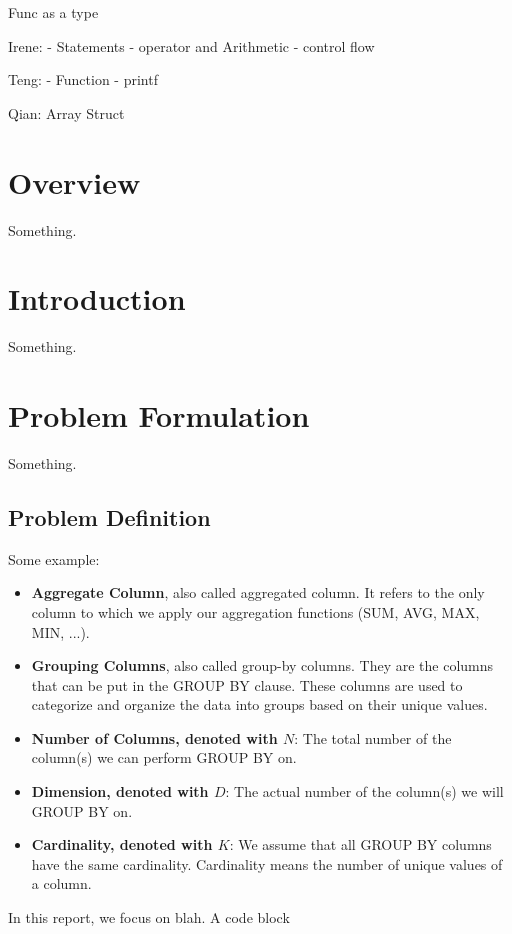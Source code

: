 \documentclass[11pt,A4]{article}
\begin{document}
Func as a type

Irene: 
- Statements
- operator and Arithmetic
- control flow

Teng:
- Function
- printf

Qian:
Array
Struct

\section{Overview}

Something.

\section{Introduction}

Something.


\section{Problem Formulation}

Something.



\subsection{Problem Definition}

Some example:

\begin{itemize}
    \item \textbf{Aggregate Column}, also called aggregated column. It refers to the only column to which we apply our aggregation functions (SUM, AVG, MAX, MIN, ...).
    \item \textbf{Grouping Columns}, also called group-by columns. They are the columns that can be put in the GROUP BY clause. These columns are used to categorize and organize the data into groups based on their unique values.
    \item \textbf{Number of Columns, denoted with $N$}: The total number of the column(s) we can perform GROUP BY on. 
    \item \textbf{Dimension, denoted with $D$}: The actual number of the column(s) we will GROUP BY on. 
    \item \textbf{Cardinality, denoted with $K$}: We assume that all GROUP BY columns have the same cardinality. Cardinality means the number of unique values of a column.
\end{itemize}

In this report, we focus on blah. A code block
\end{document}
